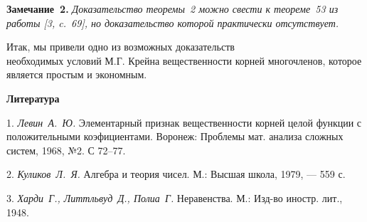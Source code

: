 \textbf{Замечание~2.} {\it Доказательство теоремы~2 можно свести к теореме~53 из работы [3, c.~69], но доказательство которой практически отсутствует. }

Итак, мы привели одно из возможных доказательств \\ необходимых условий М.Г. Крейна вещественности корней многочленов, которое является простым и экономным.


\smallskip \centerline {\bf Литература} \nopagebreak

1. {\it Левин~А.~Ю.} Элементарный признак вещественности корней целой функции с положительными коэфициентами. Воронеж: Проблемы мат. анализа сложных систем, 1968, №2. С 72–77.

2. {\it Куликов~Л.~Я.} Алгебра и теория чисел. М.: Высшая школа, 1979, — 559 с.

3. {\it Харди~Г., Литтльвуд~Д., Полиа~Г.} Неравенства. М.: Изд-во иностр. лит., 1948.

